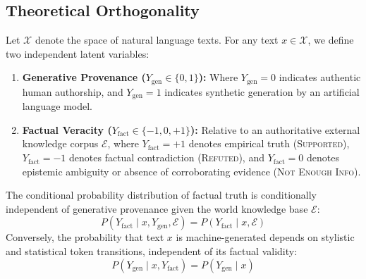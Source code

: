 \subsection{Theoretical Orthogonality}
Let $\mathcal{X}$ denote the space of natural language texts. For any text $x \in \mathcal{X}$, we define two independent latent variables:
\begin{enumerate}
    \item \textbf{Generative Provenance ($Y_{\text{gen}} \in \{0, 1\}$):} Where $Y_{\text{gen}} = 0$ indicates authentic human authorship, and $Y_{\text{gen}} = 1$ indicates synthetic generation by an artificial language model.
    \item \textbf{Factual Veracity ($Y_{\text{fact}} \in \{-1, 0, +1\}$):} Relative to an authoritative external knowledge corpus $\mathcal{E}$, where $Y_{\text{fact}} = +1$ denotes empirical truth (\textsc{Supported}), $Y_{\text{fact}} = -1$ denotes factual contradiction (\textsc{Refuted}), and $Y_{\text{fact}} = 0$ denotes epistemic ambiguity or absence of corroborating evidence (\textsc{Not Enough Info}).
\end{enumerate}

\begin{proposition}
The conditional probability distribution of factual truth is conditionally independent of generative provenance given the world knowledge base $\mathcal{E}$:
\begin{equation}
    P(Y_{\text{fact}} \mid x, Y_{\text{gen}}, \mathcal{E}) = P(Y_{\text{fact}} \mid x, \mathcal{E})
\end{equation}
Conversely, the probability that text $x$ is machine-generated depends on stylistic and statistical token transitions, independent of its factual validity:
\begin{equation}
    P(Y_{\text{gen}} \mid x, Y_{\text{fact}}) = P(Y_{\text{gen}} \mid x)
\end{equation}
\end{proposition}

